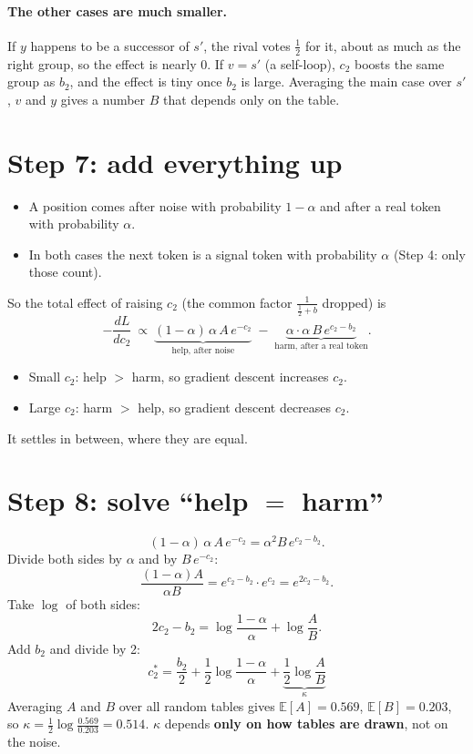 \documentclass[11pt]{article}
\newcommand{\1}{\mathbf{1}}
\begin{document}
\paragraph{The other cases are much smaller.} If $y$ happens to be a successor of $s'$, the rival votes
$\tfrac12$ for it, about as much as the right group, so the effect is nearly $0$. If $v=s'$ (a self-loop),
$c_2$ boosts the same group as $b_2$, and the effect is tiny once $b_2$ is large. Averaging the main case
over $s'$, $v$ and $y$ gives a number $B$ that depends only on the table.

\section{Step 7: add everything up}
\begin{itemize}
\item A position comes after noise with probability $1-\alpha$ and after a real token with probability $\alpha$.
\item In both cases the next token is a signal token with probability $\alpha$ (Step 4: only those count).
\end{itemize}
So the total effect of raising $c_2$ (the common factor $\frac1{\frac12+b}$ dropped) is
\[
-\frac{dL}{dc_2}\ \propto\ \underbrace{(1-\alpha)\,\alpha\,A\,e^{-c_2}}_{\text{help, after noise}}
\;-\;\underbrace{\alpha\cdot\alpha\,B\,e^{c_2-b_2}}_{\text{harm, after a real token}} .
\]
\begin{itemize}
\item Small $c_2$: help $>$ harm, so gradient descent increases $c_2$.
\item Large $c_2$: harm $>$ help, so gradient descent decreases $c_2$.
\end{itemize}
It settles in between, where they are equal.

\section{Step 8: solve ``help $=$ harm''}
\[
(1-\alpha)\,\alpha\,A\,e^{-c_2}=\alpha^2B\,e^{c_2-b_2}.
\]
Divide both sides by $\alpha$ and by $B\,e^{-c_2}$:
\[
\frac{(1-\alpha)A}{\alpha B}=e^{c_2-b_2}\cdot e^{c_2}=e^{2c_2-b_2}.
\]
Take $\log$ of both sides:
\[
2c_2-b_2=\log\frac{1-\alpha}{\alpha}+\log\frac AB .
\]
Add $b_2$ and divide by 2:
\[
\boxed{\ c_2^\ast=\frac{b_2}{2}+\frac12\log\frac{1-\alpha}{\alpha}+\underbrace{\frac12\log\frac AB}_{\kappa}\ }
\]
Averaging $A$ and $B$ over all random tables gives $\mathbb E[A]=0.569$, $\mathbb E[B]=0.203$, so
$\kappa=\frac12\log\frac{0.569}{0.203}=0.514$. $\kappa$ depends \textbf{only on how tables are drawn}, not on the noise.
\end{document}
